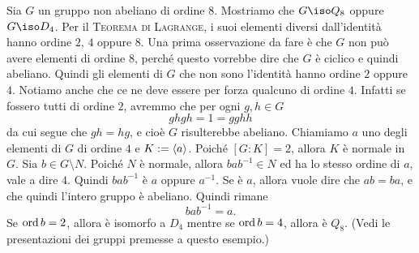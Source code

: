 \begin{esem}
 Sia \(G\) un gruppo non abeliano di ordine $8$. Mostriamo che $G \iso Q_8$ oppure $G \iso D_4$.\newline
Per il {\scshape Teorema di Lagrange}, i suoi elementi diversi dall'identità hanno ordine $2$, $4$ oppure $8$. Una prima osservazione da fare è che $G$ non può avere elementi di ordine $8$, perché questo vorrebbe dire che $G$ è ciclico e quindi abeliano. Quindi gli elementi di $G$ che non sono l'identità hanno ordine $2$ oppure $4$.\newline
Notiamo anche che ce ne deve essere per forza qualcuno di ordine $4$. Infatti se fossero tutti di ordine $2$, avremmo che per ogni $g, h \in G$
\[ghgh = 1 = gghh \]
da cui segue che $gh = hg$, e cioè $G$ risulterebbe abeliano.\newline
Chiamiamo $a$ uno degli elementi di $G$ di ordine $4$ e $K := \left\langle a\right\rangle$. Poiché $[G:K] = 2$, allora $K$ è normale in $G$. Sia $b \in G \setminus N$.\newline
Poiché $N$ è normale, allora $b a b^{-1} \in N$ ed ha lo stesso ordine di $a$, vale a dire $4$.  Quindi $bab^{-1}$ è $a$ oppure $a^{-1}$. Se è $a$, allora vuole dire che $ab = ba$, e che quindi l'intero gruppo è abeliano.  Quindi rimane
\[b a b^{-1} = a .\]
Se $\operatorname{ord} b = 2$, allora è isomorfo a $D_4$ mentre se $\operatorname{ord} b = 4$, allora è $Q_8$. (Vedi le presentazioni dei gruppi premesse a questo esempio.)
\end{esem}

